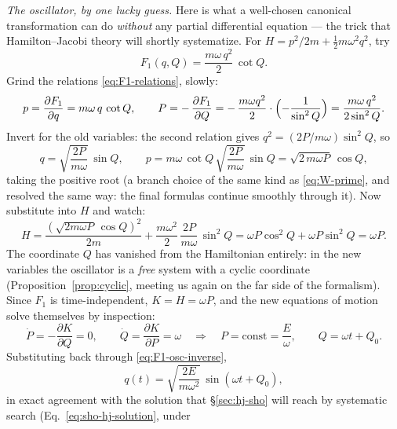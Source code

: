 \documentclass[11pt]{article}
\theoremstyle{plain}
\theoremstyle{definition}
\theoremstyle{remark}
\newcommand{\pd}[2]{\frac{\partial #1}{\partial #2}}
\begin{document}
\emph{The oscillator, by one lucky guess.} Here is what a
well-chosen canonical transformation can do \emph{without} any
partial differential equation --- the trick that Hamilton--Jacobi
theory will shortly systematize. For
$H = p^2/2m + \tfrac12 m\omega^2 q^2$, try
\begin{equation}
  F_1(q, Q) = \frac{m\omega\,q^2}{2}\,\cot Q .
  \label{eq:F1-osc}
\end{equation}
Grind the relations \eqref{eq:F1-relations}, slowly:
\begin{equation}
  p = \pd{F_1}{q} = m\omega\,q\,\cot Q,
  \qquad
  P = -\,\pd{F_1}{Q}
    = -\,\frac{m\omega q^2}{2}\cdot
      \Bigl(-\frac{1}{\sin^2 Q}\Bigr)
    = \frac{m\omega\,q^2}{2\sin^2 Q} .
  \label{eq:F1-osc-relations}
\end{equation}
Invert for the old variables: the second relation gives
$q^2 = (2P/m\omega)\sin^2 Q$, so
\begin{equation}
  q = \sqrt{\frac{2P}{m\omega}}\,\sin Q,
  \qquad
  p = m\omega\,\cot Q\,\sqrt{\frac{2P}{m\omega}}\,\sin Q
    = \sqrt{2\,m\omega P}\,\cos Q ,
  \label{eq:F1-osc-inverse}
\end{equation}
taking the positive root (a branch choice of the same kind as
\eqref{eq:W-prime}, and resolved the same way: the final formulas
continue smoothly through it). Now substitute into $H$ and watch:
\begin{equation}
  H = \frac{(\sqrt{2m\omega P}\,\cos Q)^2}{2m}
    + \frac{m\omega^2}{2}\,\frac{2P}{m\omega}\,\sin^2 Q
  = \omega P\cos^2 Q + \omega P \sin^2 Q
  = \omega P .
\end{equation}
The coordinate $Q$ has vanished from the Hamiltonian entirely: in the
new variables the oscillator is a \emph{free} system with a cyclic
coordinate (Proposition~\ref{prop:cyclic}, meeting us again on the
far side of the formalism). Since $F_1$ is time-independent,
$K = H = \omega P$, and the new equations of motion solve themselves
by inspection:
\begin{equation}
  \dot P = -\pd{K}{Q} = 0,
  \qquad
  \dot Q = \pd{K}{P} = \omega
  \quad\Longrightarrow\quad
  P = \text{const} = \frac{E}{\omega},
  \qquad
  Q = \omega t + Q_0 .
\end{equation}
Substituting back through \eqref{eq:F1-osc-inverse},
\begin{equation}
  q(t) = \sqrt{\frac{2E}{m\omega^2}}\,\sin(\omega t + Q_0),
\end{equation}
in exact agreement with the solution that \S\ref{sec:hj-sho} will
reach by systematic search (Eq.~\eqref{eq:sho-hj-solution}, under
\end{document}
